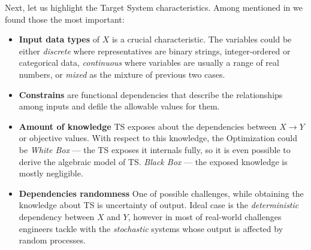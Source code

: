 Next, let us highlight the Target System characteristics.
Among mentioned in \cite{biegler2004retrospective,figueira2014hybrid,amaran2016simulation} we found those the most important:
\begin{itemize}[itemsep=8pt]
	\item \textbf{Input data types} of $X$ is a crucial characteristic. The variables could be either \textit{discrete} where representatives are binary strings, integer-ordered or categorical data, %
	\textit{continuous} where variables are usually a range of real numbers, or \textit{mixed} as the mixture of previous two cases.

	\item \textbf{Constrains} are functional dependencies that describe the relationships among inputs and defile the allowable values for them.

	\item \textbf{Amount of knowledge} TS exposes about the dependencies between $X \rightarrow Y$ or objective values. With respect to this knowledge, the Optimization could be \textit{White Box} — the TS exposes it internals fully, so it is even possible to derive the algebraic model of TS.
	\textit{Black Box} — the exposed knowledge is mostly negligible.


	\item \textbf{Dependencies randomness} One of possible challenges, while obtaining the knowledge about TS is uncertainty of output. Ideal case is the \textit{deterministic} dependency between $X$ and $Y$, however in most of real-world challenges engineers tackle with the \textit{stochastic} systems whose output is affected by random processes. 


\end{itemize}
